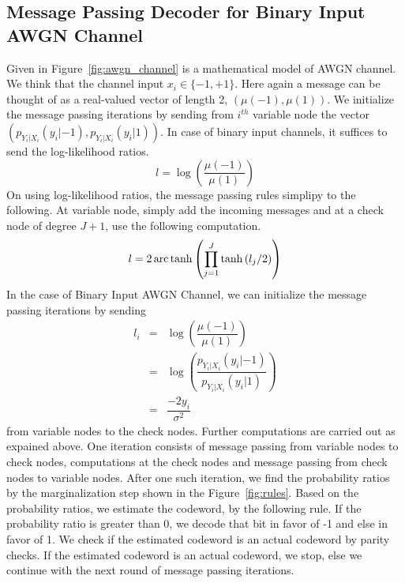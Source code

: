 \subsection{Message Passing Decoder for Binary Input AWGN Channel}
Given in Figure~\ref{fig:awgn_channel} is a mathematical model of AWGN channel.
We think that the channel input $x_i \in \lbrace -1, +1\rbrace$.
Here again a message can be thought of as a real-valued vector of length 2, $(\mu(-1), \mu(1))$. We initialize the message passing iterations by sending from 
$i^{th}$ variable node the vector $(p_{Y_i|X_i}(y_i|-1), p_{Y_i|X_i}(y_i|1))$. In case of binary input channels, it suffices to send the log-likelihood ratios.
 \begin{equation*}
 l = \log \left(\dfrac{\mu(-1)}{\mu(1)}\right)
 \end{equation*}
On using log-likelihood ratios, the message passing rules simplipy to the following. At variable node, simply add the incoming messages and at a check node of degree $J + 1$,
use the following computation.
\begin{equation}
 l = 2 \operatorname*{arc\,tanh} \left( \prod_{j=1}^J \tanh \left(l_j/2\right)\right) 
\end{equation}
In the case of Binary Input AWGN Channel, we can initialize the message passing iterations by sending 
\begin{eqnarray}
 l_i &=& \log \left(\dfrac{\mu(-1)}{\mu(1)}\right) \\
     &=& \log \left(\dfrac{p_{Y_i|X_i}(y_i|-1)}{p_{Y_i|X_i}(y_i|1)}\right) \\
     &=& \dfrac{-2y_i}{\sigma^2}
\end{eqnarray}
from variable nodes to the check nodes. Further computations are carried out as expained above.
One iteration consists of message passing from variable nodes to check nodes, computations at the check nodes and 
message passing from check nodes to variable nodes. After one such iteration, we find the probability ratios by the marginalization
step shown in the Figure~\ref{fig:rules}. Based on the probability ratios, we estimate the codeword, by the following rule. If the probability ratio is greater than 0, we decode that bit
in favor of -1 and else in favor of 1. We check if the estimated codeword is an actual codeword by parity checks. If the estimated codeword is an actual codeword, we stop, else
we continue with the next round of message passing iterations.